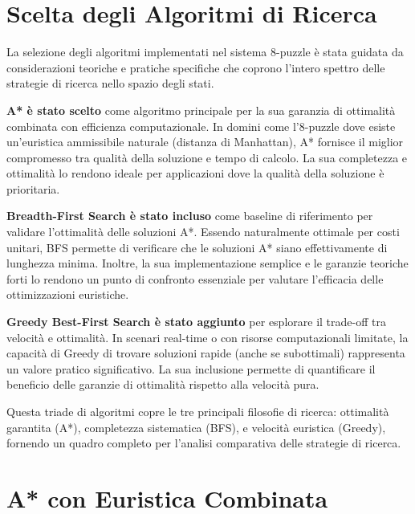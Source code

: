 \documentclass[12pt,a4paper]{report}
\theoremstyle{definition}
\begin{document}
\section{Scelta degli Algoritmi di Ricerca}

La selezione degli algoritmi implementati nel sistema 8-puzzle è stata guidata da considerazioni teoriche e pratiche specifiche che coprono l'intero spettro delle strategie di ricerca nello spazio degli stati.

\textbf{A* è stato scelto} come algoritmo principale per la sua garanzia di ottimalità combinata con efficienza computazionale. In domini come l'8-puzzle dove esiste un'euristica ammissibile naturale (distanza di Manhattan), A* fornisce il miglior compromesso tra qualità della soluzione e tempo di calcolo. La sua completezza e ottimalità lo rendono ideale per applicazioni dove la qualità della soluzione è prioritaria.

\textbf{Breadth-First Search è stato incluso} come baseline di riferimento per validare l'ottimalità delle soluzioni A*. Essendo naturalmente ottimale per costi unitari, BFS permette di verificare che le soluzioni A* siano effettivamente di lunghezza minima. Inoltre, la sua implementazione semplice e le garanzie teoriche forti lo rendono un punto di confronto essenziale per valutare l'efficacia delle ottimizzazioni euristiche.

\textbf{Greedy Best-First Search è stato aggiunto} per esplorare il trade-off tra velocità e ottimalità. In scenari real-time o con risorse computazionali limitate, la capacità di Greedy di trovare soluzioni rapide (anche se subottimali) rappresenta un valore pratico significativo. La sua inclusione permette di quantificare il beneficio delle garanzie di ottimalità rispetto alla velocità pura.

Questa triade di algoritmi copre le tre principali filosofie di ricerca: ottimalità garantita (A*), completezza sistematica (BFS), e velocità euristica (Greedy), fornendo un quadro completo per l'analisi comparativa delle strategie di ricerca.

\section{A* con Euristica Combinata}
\end{document}
